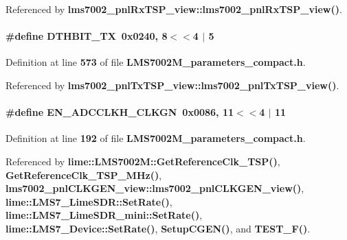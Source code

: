Referenced by {\bf lms7002\+\_\+pnl\+Rx\+T\+S\+P\+\_\+view\+::lms7002\+\_\+pnl\+Rx\+T\+S\+P\+\_\+view()}.

\paragraph[{D\+T\+H\+B\+I\+T\+\_\+\+TX}]{\setlength{\rightskip}{0pt plus 5cm}\#define D\+T\+H\+B\+I\+T\+\_\+\+TX~0x0240, 8$<$$<$4 $\vert$  5}\label{LMS7002M__parameters__compact_8h_a6ea0420a6a9e8cdbcce1482756747d42}


Definition at line {\bf 573} of file {\bf L\+M\+S7002\+M\+\_\+parameters\+\_\+compact.\+h}.



Referenced by {\bf lms7002\+\_\+pnl\+Tx\+T\+S\+P\+\_\+view\+::lms7002\+\_\+pnl\+Tx\+T\+S\+P\+\_\+view()}.

\paragraph[{E\+N\+\_\+\+A\+D\+C\+C\+L\+K\+H\+\_\+\+C\+L\+K\+GN}]{\setlength{\rightskip}{0pt plus 5cm}\#define E\+N\+\_\+\+A\+D\+C\+C\+L\+K\+H\+\_\+\+C\+L\+K\+GN~0x0086, 11$<$$<$4 $\vert$  11}\label{LMS7002M__parameters__compact_8h_ab1ac4c2045d6cafb280d5bae7c8fb741}


Definition at line {\bf 192} of file {\bf L\+M\+S7002\+M\+\_\+parameters\+\_\+compact.\+h}.



Referenced by {\bf lime\+::\+L\+M\+S7002\+M\+::\+Get\+Reference\+Clk\+\_\+\+T\+S\+P()}, {\bf Get\+Reference\+Clk\+\_\+\+T\+S\+P\+\_\+\+M\+Hz()}, {\bf lms7002\+\_\+pnl\+C\+L\+K\+G\+E\+N\+\_\+view\+::lms7002\+\_\+pnl\+C\+L\+K\+G\+E\+N\+\_\+view()}, {\bf lime\+::\+L\+M\+S7\+\_\+\+Lime\+S\+D\+R\+::\+Set\+Rate()}, {\bf lime\+::\+L\+M\+S7\+\_\+\+Lime\+S\+D\+R\+\_\+mini\+::\+Set\+Rate()}, {\bf lime\+::\+L\+M\+S7\+\_\+\+Device\+::\+Set\+Rate()}, {\bf Setup\+C\+G\+E\+N()}, and {\bf T\+E\+S\+T\+\_\+\+F()}.

